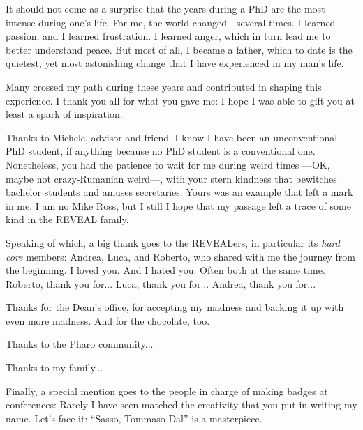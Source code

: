 
\begin{acknowledgements}

It should not come as a surprise that the years during a PhD are the most intense during one's life.
For me, the world changed---several times.
I learned passion, and I learned frustration.
I learned anger, which in turn lead me to better understand peace.
But most of all, I became a father, which to date is the quietest, yet most astonishing change that I have experienced in my man's life.

Many crossed my path during these years and contributed in shaping this experience.
I thank you all for what you gave me: I hope I was able to gift you at least a spark of inspiration.

Thanks to Michele, advisor and friend.
I know I have been an unconventional PhD student, if anything because no PhD student is a conventional one.
Nonetheless, you had the patience to wait for me during weird times ---OK, maybe not crazy-Rumanian weird---, with your stern kindness that bewitches bachelor students and amuses secretaries.
Yours was an example that left a mark in me.
I am no Mike Ross, but I still I hope that my passage left a trace of some kind in the REVEAL family.

Speaking of which, a big thank goes to the REVEALers, in particular its \emph{hard core} members: Andrea, Luca, and Roberto, who shared with me the journey from the beginning.
I loved you. And I hated you. Often both at the same time.
Roberto, thank you for...
Luca, thank you for...
Andrea, thank you for...

Thanks for the Dean's office, for accepting my madness and backing it up with even more madness.
And for the chocolate, too.

Thanks to the Pharo community...

Thanks to my family...

Finally, a special mention goes to the people in charge of making badges at conferences: Rarely I have seen matched the creativity that you put in writing my name.
Let's face it: ``Sasso, Tommaso Dal'' is a masterpiece.



\end{acknowledgements}
